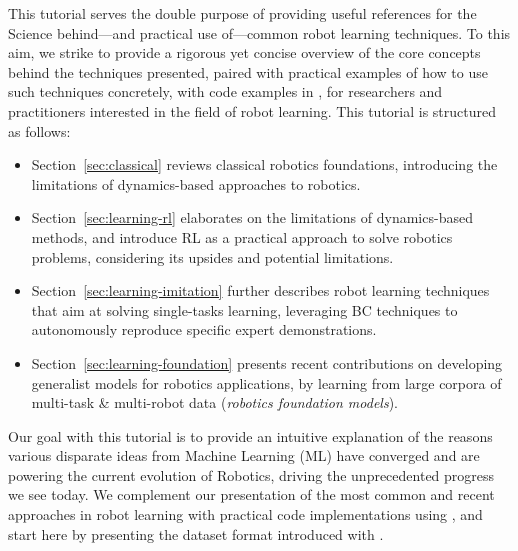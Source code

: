 This tutorial serves the double purpose of providing useful references for the Science behind---and practical use of---common robot learning techniques.
To this aim, we strike to provide a rigorous yet concise overview of the core concepts behind the techniques presented, paired with practical examples of how to use such techniques concretely, with code examples in \lerobot, for researchers and practitioners interested in the field of robot learning.
This tutorial is structured as follows:
\begin{itemize}
\item Section~\ref{sec:classical} reviews classical robotics foundations, introducing the limitations of dynamics-based approaches to robotics.
\item Section~\ref{sec:learning-rl} elaborates on the limitations of dynamics-based methods, and introduce RL as a practical approach to solve robotics problems, considering its upsides and potential limitations.
\item Section~\ref{sec:learning-imitation} further describes robot learning techniques that aim at solving single-tasks learning, leveraging BC techniques to autonomously reproduce specific expert demonstrations.
\item Section~\ref{sec:learning-foundation} presents recent contributions on developing generalist models for robotics applications, by learning from large corpora of multi-task \& multi-robot data (\emph{robotics foundation models}).
\end{itemize}

Our goal with this tutorial is to provide an intuitive explanation of the reasons various disparate ideas from Machine Learning (ML) have converged and are powering the current evolution of Robotics, driving the unprecedented progress we see today.
We complement our presentation of the most common and recent approaches in robot learning with practical code implementations using \lerobot, and start here by presenting the dataset format introduced with \lerobot.

\subsection{\lerobotdataset}

